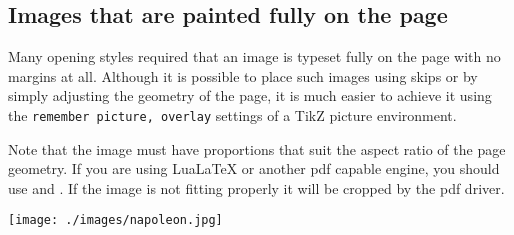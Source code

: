 \subsection{Images that are painted fully on the page}

Many opening styles required that an image is typeset fully on the page with no margins at all. Although
it is possible to place such images using skips or by simply adjusting the geometry of the page, it is much
easier to achieve it using the \texttt{remember picture, overlay} settings of a TikZ picture environment.

\begin{teX}
\newpage
\mbox{}

\newpage
\end{teX}

Note that the image must have proportions that suit the aspect ratio of the page geometry. If you are using
LuaLaTeX or another pdf capable engine, you should use \CMDI{\pdfpagewidth} and \CMDI{\pdfpageheight}. If
the image is not fitting properly it will be cropped by the pdf driver. 


\noindent\texttt{[image: ./images/napoleon.jpg]}

\newpage
{}

\newpage

\newenvironment{kathleen}[1][b]{\def\placement{#1}\parindent0pt
}{}


